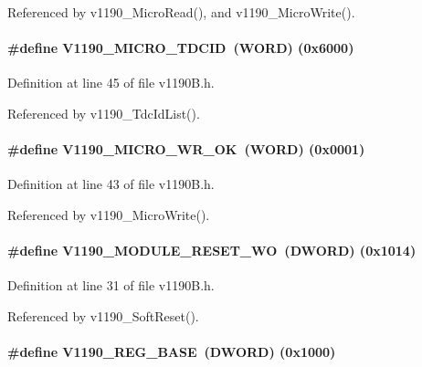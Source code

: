 Referenced by v1190\_\-MicroRead(), and v1190\_\-MicroWrite().
\paragraph[{V1190\_\-MICRO\_\-TDCID}]{\setlength{\rightskip}{0pt plus 5cm}\#define V1190\_\-MICRO\_\-TDCID~({\bf WORD}) (0x6000)}\hfill\label{v1190B_8h_ab670b9b6465bcd3b8b911d5da3f6a3aa}


Definition at line 45 of file v1190B.h.

Referenced by v1190\_\-TdcIdList().
\paragraph[{V1190\_\-MICRO\_\-WR\_\-OK}]{\setlength{\rightskip}{0pt plus 5cm}\#define V1190\_\-MICRO\_\-WR\_\-OK~({\bf WORD}) (0x0001)}\hfill\label{v1190B_8h_a3ad754c8be0067216ba5c8ec491f5893}


Definition at line 43 of file v1190B.h.

Referenced by v1190\_\-MicroWrite().
\paragraph[{V1190\_\-MODULE\_\-RESET\_\-WO}]{\setlength{\rightskip}{0pt plus 5cm}\#define V1190\_\-MODULE\_\-RESET\_\-WO~({\bf DWORD}) (0x1014)}\hfill\label{v1190B_8h_a89efca50835b6b7a4672b4c68481775b}


Definition at line 31 of file v1190B.h.

Referenced by v1190\_\-SoftReset().
\paragraph[{V1190\_\-REG\_\-BASE}]{\setlength{\rightskip}{0pt plus 5cm}\#define V1190\_\-REG\_\-BASE~({\bf DWORD}) (0x1000)}\hfill\label{v1190B_8h_a1034c1410c68bb35027308f7dc23cec1}


